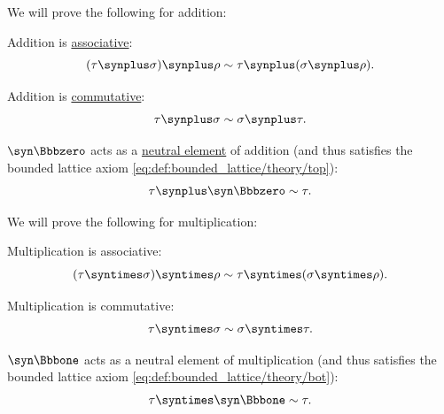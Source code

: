 \begin{proposition}
  We will prove the following for addition:
  \begin{thmenum}[resume=thm:simple_algebraic_type_arithmetic]
     Addition is \hyperref[def:binary_operation/associative]{associative}:
    \begin{equation}\label{eq:thm:simple_algebraic_type_arithmetic/addition_associative}
      (\tau \synplus \sigma) \synplus \rho \sim \tau \synplus (\sigma \synplus \rho).
    \end{equation}

     Addition is \hyperref[def:binary_operation/commutative]{commutative}:
    \begin{equation}\label{eq:thm:simple_algebraic_type_arithmetic/addition_commutative}
      \tau \synplus \sigma \sim \sigma \synplus \tau.
    \end{equation}

     \( \syn\Bbbzero \) acts as a \hyperref[def:semigroup_neutral_element]{neutral element} of addition (and thus satisfies the bounded lattice axiom \eqref{eq:def:bounded_lattice/theory/top}):
    \begin{equation}\label{eq:thm:simple_algebraic_type_arithmetic/addition_neutral}
      \tau \synplus \syn\Bbbzero \sim \tau.
    \end{equation}
  \end{thmenum}

  We will prove the following for multiplication:
  \begin{thmenum}[resume=thm:simple_algebraic_type_arithmetic]
     Multiplication is associative:
    \begin{equation}\label{eq:thm:simple_algebraic_type_arithmetic/multiplication_associative}
      (\tau \syntimes \sigma) \syntimes \rho \sim \tau \syntimes (\sigma \syntimes \rho).
    \end{equation}

     Multiplication is commutative:
    \begin{equation}\label{eq:thm:simple_algebraic_type_arithmetic/multiplication_commutative}
      \tau \syntimes \sigma \sim \sigma \syntimes \tau.
    \end{equation}

     \( \syn\Bbbone \) acts as a neutral element of multiplication (and thus satisfies the bounded lattice axiom \eqref{eq:def:bounded_lattice/theory/bot}):
    \begin{equation}\label{eq:thm:simple_algebraic_type_arithmetic/multiplication_neutral}
      \tau \syntimes \syn\Bbbone \sim \tau.
    \end{equation}
  \end{thmenum}


\end{proposition}
